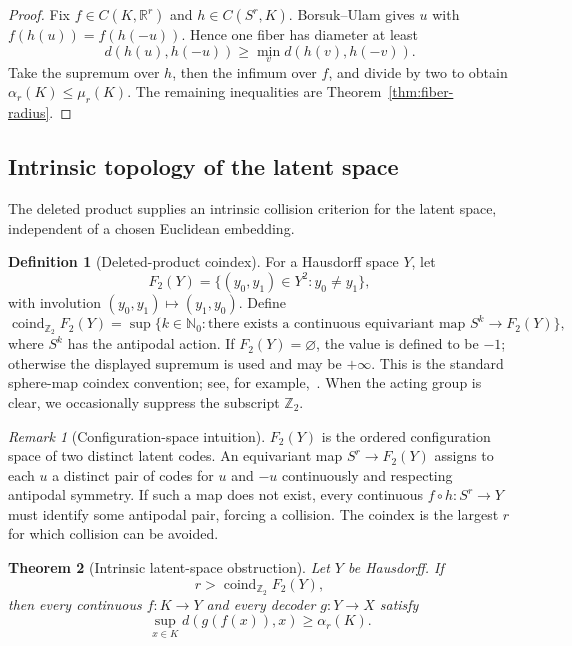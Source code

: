 \documentclass[11pt,a4paper]{article}
\theoremstyle{definition}
\newtheorem{definition}{Definition}[section]
\theoremstyle{plain}
\newtheorem{theorem}{Theorem}[section]
\theoremstyle{remark}
\newtheorem{remark}[theorem]{Remark}
\begin{document}
\begin{proof}
Fix $f\in C(K,\mathbb R^r)$ and $h\in C(S^r,K)$. Borsuk--Ulam
\cite{Matousek2003} gives $u$ with $f(h(u))=f(h(-u))$. Hence one fiber
has diameter at least
\[
d(h(u),h(-u))
\geq\min_v d(h(v),h(-v)).
\]
Take the supremum over $h$, then the infimum over $f$, and divide by two to
obtain $\alpha_r(K)\leq\mu_r(K)$. The remaining inequalities are
Theorem~\ref{thm:fiber-radius}.
\end{proof}

\subsection{Intrinsic topology of the latent space}

The deleted product supplies an intrinsic collision criterion for the latent
space, independent of a chosen Euclidean embedding.

\begin{definition}[Deleted-product coindex]
\label{def:coindex}
For a Hausdorff space $Y$, let
\[
F_2(Y)=\{(y_0,y_1)\in Y^2:y_0\neq y_1\},
\]
with involution $(y_0,y_1)\mapsto(y_1,y_0)$. Define
\[
\operatorname{coind}_{\mathbb Z_2}F_2(Y)
=\sup\{k\in\mathbb N_0:\text{there exists a continuous equivariant map }
S^k\to F_2(Y)\},
\]
where $S^k$ has the antipodal action. If $F_2(Y)=\varnothing$, the value is
defined to be $-1$; otherwise the displayed supremum is used and may be
$+\infty$. This is the standard sphere-map coindex convention; see, for
example,~\cite{Matousek2003}. When the acting group is clear, we
occasionally suppress the subscript $\mathbb Z_2$.
\end{definition}

\begin{remark}[Configuration-space intuition]
$F_2(Y)$ is the ordered configuration space of two distinct latent codes. An equivariant map $S^r\to F_2(Y)$ assigns to each $u$ a distinct pair of codes for $u$ and $-u$ continuously and respecting antipodal symmetry. If such a map does not exist, every continuous $f\circ h:S^r\to Y$ must identify some antipodal pair, forcing a collision. The coindex is the largest $r$ for which collision can be avoided.
\end{remark}

\begin{theorem}[Intrinsic latent-space obstruction]
\label{thm:intrinsic-latent}
Let $Y$ be Hausdorff. If
\[
r>\operatorname{coind}_{\mathbb Z_2}F_2(Y),
\]
then every continuous $f:K\to Y$ and every decoder $g:Y\to X$ satisfy
\[
\sup_{x\in K}d(g(f(x)),x)\geq\alpha_r(K).
\]
\end{theorem}
\end{document}
